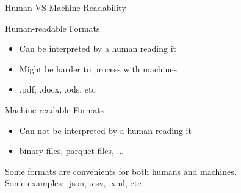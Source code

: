 \documentclass[serif, aspectratio=169]{beamer}
\begin{document}
\begin{frame}{Human VS Machine Readability}
    \begin{block}{Human-readable Formats}
        \begin{itemize}
            \item Can be interpreted by a human reading it
            \item Might be harder to process with machines
            \item .pdf, .docx, .ods, etc
        \end{itemize}
    \end{block}
    \begin{block}{Machine-readable Formats}
        \begin{itemize}
            \item Can not be interpreted by a human reading it
            \item binary files, parquet files, ...
        \end{itemize}
    \end{block}
    \begin{center}
        \Large
        Some formats are convenients for both humans and machines. \\
        Some examples: .json, .csv, .xml, etc
    \end{center}
\end{frame}

\end{document}
